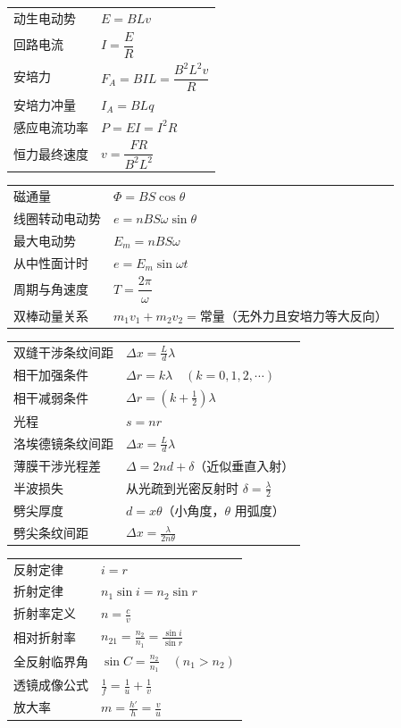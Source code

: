 \begin{tabularx}{\columnwidth}{XX}
  动生电动势 & $E=BLv$ \\
  回路电流 & $I=\dfrac{E}{R}$ \\
  安培力 & $F_A=BIL=\dfrac{B^2L^2v}{R}$ \\
  安培力冲量 & $I_A=BLq$ \\
  感应电流功率 & $P=EI=I^2R$ \\
  恒力最终速度 & $v=\dfrac{FR}{B^2L^2}$ \\
\end{tabularx}
\medskip

\begin{tabularx}{\columnwidth}{XX}
  磁通量 & $\Phi=BS\cos\theta$ \\
  线圈转动电动势 & $e=nBS\omega\sin\theta$ \\
  最大电动势 & $E_m=nBS\omega$ \\
  从中性面计时 & $e=E_m\sin\omega t$ \\
  周期与角速度 & $T=\dfrac{2\pi}{\omega}$ \\
  双棒动量关系 & $m_1v_1+m_2v_2=\text{常量}$（无外力且安培力等大反向） \\
\end{tabularx}
\medskip

\begin{tabularx}{\columnwidth}{XX}
  双缝干涉条纹间距 & $\Delta x=\frac{L}{d}\lambda$ \\
  相干加强条件 & $\Delta r=k\lambda\quad(k=0,1,2,\cdots)$ \\
  相干减弱条件 & $\Delta r=(k+\frac12)\lambda$ \\
  光程 & $s=nr$ \\
  洛埃德镜条纹间距 & $\Delta x=\frac{L}{d}\lambda$ \\
  薄膜干涉光程差 & $\Delta=2nd+\delta$（近似垂直入射） \\
  半波损失 & 从光疏到光密反射时 $\delta=\frac{\lambda}{2}$ \\
  劈尖厚度 & $d=x\theta$（小角度，$\theta$ 用弧度） \\
  劈尖条纹间距 & $\Delta x=\frac{\lambda}{2n\theta}$ \\
\end{tabularx}
\medskip

\begin{tabularx}{\columnwidth}{XX}
  反射定律 & $i=r$ \\
  折射定律 & $n_1\sin i=n_2\sin r$ \\
  折射率定义 & $n=\frac{c}{v}$ \\
  相对折射率 & $n_{21}=\frac{n_2}{n_1}=\frac{\sin i}{\sin r}$ \\
  全反射临界角 & $\sin C=\frac{n_2}{n_1}\quad(n_1>n_2)$ \\
  透镜成像公式 & $\frac{1}{f}=\frac{1}{u}+\frac{1}{v}$ \\
  放大率 & $m=\frac{h'}{h}=\frac{v}{u}$ \\
\end{tabularx}
\medskip


